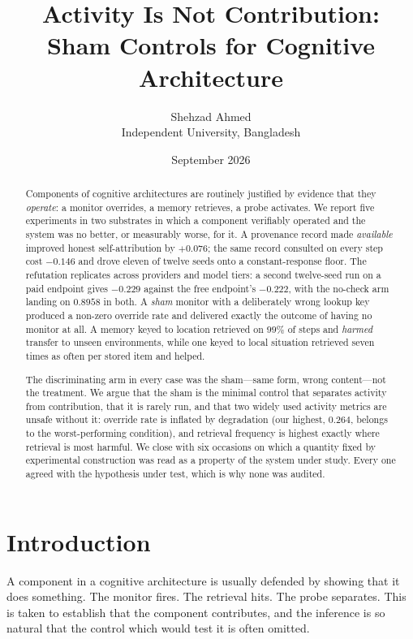 \documentclass[11pt]{article}
\title{\bfseries Activity Is Not Contribution:\\
Sham Controls for Cognitive Architecture}
\author{Shehzad Ahmed\\\small Independent University, Bangladesh}
\date{September 2026}
\begin{document}
\maketitle

\begin{abstract}
\noindent
Components of cognitive architectures are routinely justified by evidence that
they \emph{operate}: a monitor overrides, a memory retrieves, a probe
activates. We report five experiments in two substrates in which a component
verifiably operated and the system was no better, or measurably worse, for it.
A provenance record made \emph{available} improved honest self-attribution by
$+0.076$; the same record consulted on every step cost $-0.146$ and drove
eleven of twelve seeds onto a constant-response floor. The refutation replicates across
providers and model tiers: a second twelve-seed run on a paid endpoint gives
$-0.229$ against the free endpoint's $-0.222$, with the no-check arm landing on
$0.8958$ in both. A \emph{sham} monitor with a deliberately wrong lookup key
produced a non-zero override rate and delivered exactly the outcome of having
no monitor at all. A memory keyed to
location retrieved on $99\%$ of steps and \emph{harmed} transfer to unseen
environments, while one keyed to local situation retrieved seven times as
often per stored item and helped.

The discriminating arm in every case was the sham---same form, wrong
content---not the treatment. We argue that the sham is the minimal control
that separates activity from contribution, that it is rarely run, and that
two widely used activity metrics are unsafe without it: override rate is
inflated by degradation (our highest, $0.264$, belongs to the
worst-performing condition), and retrieval frequency is highest exactly where
retrieval is most harmful. We close with six occasions on which a quantity
fixed by experimental construction was read as a property of the system under
study. Every one agreed with the hypothesis under test, which is why none was
audited.
\end{abstract}

\section{Introduction}

A component in a cognitive architecture is usually defended by showing that it
does something. The monitor fires. The retrieval hits. The probe separates.
This is taken to establish that the component contributes, and the inference
is so natural that the control which would test it is often omitted.
\end{document}
